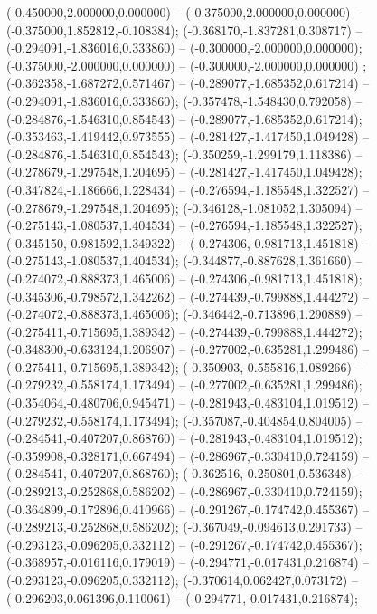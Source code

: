  (-0.450000,2.000000,0.000000) -- (-0.375000,2.000000,0.000000) -- (-0.375000,1.852812,-0.108384);
 (-0.368170,-1.837281,0.308717) -- (-0.294091,-1.836016,0.333860) -- (-0.300000,-2.000000,0.000000);
 (-0.375000,-2.000000,0.000000) -- (-0.300000,-2.000000,0.000000) ;
 (-0.362358,-1.687272,0.571467) -- (-0.289077,-1.685352,0.617214) -- (-0.294091,-1.836016,0.333860);
 (-0.357478,-1.548430,0.792058) -- (-0.284876,-1.546310,0.854543) -- (-0.289077,-1.685352,0.617214);
 (-0.353463,-1.419442,0.973555) -- (-0.281427,-1.417450,1.049428) -- (-0.284876,-1.546310,0.854543);
 (-0.350259,-1.299179,1.118386) -- (-0.278679,-1.297548,1.204695) -- (-0.281427,-1.417450,1.049428);
 (-0.347824,-1.186666,1.228434) -- (-0.276594,-1.185548,1.322527) -- (-0.278679,-1.297548,1.204695);
 (-0.346128,-1.081052,1.305094) -- (-0.275143,-1.080537,1.404534) -- (-0.276594,-1.185548,1.322527);
 (-0.345150,-0.981592,1.349322) -- (-0.274306,-0.981713,1.451818) -- (-0.275143,-1.080537,1.404534);
 (-0.344877,-0.887628,1.361660) -- (-0.274072,-0.888373,1.465006) -- (-0.274306,-0.981713,1.451818);
 (-0.345306,-0.798572,1.342262) -- (-0.274439,-0.799888,1.444272) -- (-0.274072,-0.888373,1.465006);
 (-0.346442,-0.713896,1.290889) -- (-0.275411,-0.715695,1.389342) -- (-0.274439,-0.799888,1.444272);
 (-0.348300,-0.633124,1.206907) -- (-0.277002,-0.635281,1.299486) -- (-0.275411,-0.715695,1.389342);
 (-0.350903,-0.555816,1.089266) -- (-0.279232,-0.558174,1.173494) -- (-0.277002,-0.635281,1.299486);
 (-0.354064,-0.480706,0.945471) -- (-0.281943,-0.483104,1.019512) -- (-0.279232,-0.558174,1.173494);
 (-0.357087,-0.404854,0.804005) -- (-0.284541,-0.407207,0.868760) -- (-0.281943,-0.483104,1.019512);
 (-0.359908,-0.328171,0.667494) -- (-0.286967,-0.330410,0.724159) -- (-0.284541,-0.407207,0.868760);
 (-0.362516,-0.250801,0.536348) -- (-0.289213,-0.252868,0.586202) -- (-0.286967,-0.330410,0.724159);
 (-0.364899,-0.172896,0.410966) -- (-0.291267,-0.174742,0.455367) -- (-0.289213,-0.252868,0.586202);
 (-0.367049,-0.094613,0.291733) -- (-0.293123,-0.096205,0.332112) -- (-0.291267,-0.174742,0.455367);
 (-0.368957,-0.016116,0.179019) -- (-0.294771,-0.017431,0.216874) -- (-0.293123,-0.096205,0.332112);
 (-0.370614,0.062427,0.073172) -- (-0.296203,0.061396,0.110061) -- (-0.294771,-0.017431,0.216874);

